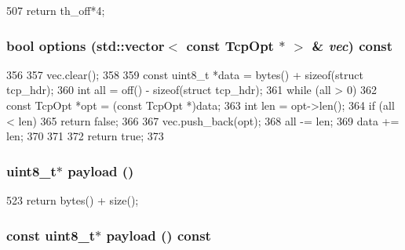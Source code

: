 \begin{DoxyCode}
507 { return th_off*4; }
\end{DoxyCode}
\hypertarget{structNet_1_1TcpHdr_ad42e4f03cdf97f26900594dc2c07c43f}{
\subsubsection[{options}]{\setlength{\rightskip}{0pt plus 5cm}bool options ({\bf std::vector}$<$ const {\bf TcpOpt} $\ast$ $>$ \& {\em vec}) const}}
\label{structNet_1_1TcpHdr_ad42e4f03cdf97f26900594dc2c07c43f}



\begin{DoxyCode}
356 {
357     vec.clear();
358 
359     const uint8_t *data = bytes() + sizeof(struct tcp_hdr);
360     int all = off() - sizeof(struct tcp_hdr);
361     while (all > 0) {
362         const TcpOpt *opt = (const TcpOpt *)data;
363         int len = opt->len();
364         if (all < len)
365             return false;
366 
367         vec.push_back(opt);
368         all -= len;
369         data += len;
370     }
371 
372     return true;
373 }
\end{DoxyCode}
\hypertarget{structNet_1_1TcpHdr_a79ce21e3572e587b71de7af1ac640b6f}{
\subsubsection[{payload}]{\setlength{\rightskip}{0pt plus 5cm}uint8\_\-t$\ast$ payload ()}}
\label{structNet_1_1TcpHdr_a79ce21e3572e587b71de7af1ac640b6f}



\begin{DoxyCode}
523 { return bytes() + size(); }
\end{DoxyCode}
\hypertarget{structNet_1_1TcpHdr_a5f0d069ddb9d067af9e94963bd1fc7a2}{
\subsubsection[{payload}]{\setlength{\rightskip}{0pt plus 5cm}const uint8\_\-t$\ast$ payload () const}}
\label{structNet_1_1TcpHdr_a5f0d069ddb9d067af9e94963bd1fc7a2}



